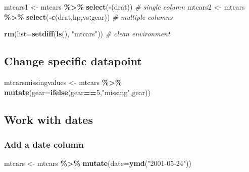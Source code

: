 \documentclass[
]{article}
\newenvironment{Shaded}{\begin{snugshade}}{\end{snugshade}}
\newcommand{\AttributeTok}[1]{\textcolor[rgb]{0.13,0.29,0.53}{#1}}
\newcommand{\CommentTok}[1]{\textcolor[rgb]{0.56,0.35,0.01}{\textit{#1}}}
\newcommand{\DecValTok}[1]{\textcolor[rgb]{0.00,0.00,0.81}{#1}}
\newcommand{\FunctionTok}[1]{\textcolor[rgb]{0.13,0.29,0.53}{\textbf{#1}}}
\newcommand{\NormalTok}[1]{#1}
\newcommand{\OtherTok}[1]{\textcolor[rgb]{0.56,0.35,0.01}{#1}}
\newcommand{\SpecialCharTok}[1]{\textcolor[rgb]{0.81,0.36,0.00}{\textbf{#1}}}
\newcommand{\StringTok}[1]{\textcolor[rgb]{0.31,0.60,0.02}{#1}}
\begin{document}
\begin{Shaded}
\begin{Highlighting}[]
\NormalTok{mtcars1 }\OtherTok{\textless{}{-}}\NormalTok{ mtcars }\SpecialCharTok{\%\textgreater{}\%} \FunctionTok{select}\NormalTok{(}\SpecialCharTok{{-}}\NormalTok{(drat)) }\CommentTok{\# single column}
\NormalTok{mtcars2 }\OtherTok{\textless{}{-}}\NormalTok{ mtcars }\SpecialCharTok{\%\textgreater{}\%} \FunctionTok{select}\NormalTok{(}\SpecialCharTok{{-}}\FunctionTok{c}\NormalTok{(drat,hp,vs}\SpecialCharTok{:}\NormalTok{gear)) }\CommentTok{\# multiple columns}

\FunctionTok{rm}\NormalTok{(}\AttributeTok{list=}\FunctionTok{setdiff}\NormalTok{(}\FunctionTok{ls}\NormalTok{(), }\StringTok{"mtcars"}\NormalTok{)) }\CommentTok{\# clean environment}
\end{Highlighting}
\end{Shaded}

\hypertarget{change-specific-datapoint}{%
\subsection{Change specific datapoint}\label{change-specific-datapoint}}

\begin{Shaded}
\begin{Highlighting}[]
\NormalTok{mtcarsmissingvalues }\OtherTok{\textless{}{-}}\NormalTok{ mtcars }\SpecialCharTok{\%\textgreater{}\%} \FunctionTok{mutate}\NormalTok{(}\AttributeTok{gear=}\FunctionTok{ifelse}\NormalTok{(gear}\SpecialCharTok{==}\DecValTok{5}\NormalTok{,}\StringTok{"missing"}\NormalTok{,gear))}
\end{Highlighting}
\end{Shaded}

\hypertarget{work-with-dates}{%
\subsection{Work with dates}\label{work-with-dates}}

\hypertarget{add-a-date-column}{%
\subsubsection{Add a date column}\label{add-a-date-column}}

\begin{Shaded}
\begin{Highlighting}[]
\NormalTok{mtcars }\OtherTok{\textless{}{-}}\NormalTok{ mtcars }\SpecialCharTok{\%\textgreater{}\%} \FunctionTok{mutate}\NormalTok{(}\AttributeTok{date=}\FunctionTok{ymd}\NormalTok{(}\StringTok{"2001{-}05{-}24"}\NormalTok{))}
\end{Highlighting}
\end{Shaded}
\end{document}
